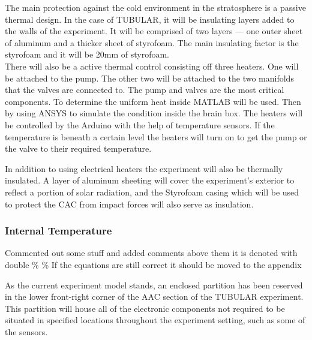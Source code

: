 The main protection against the cold environment in the stratosphere is a passive thermal design. In the case of TUBULAR, it will be insulating layers added to the walls of the experiment. It will be comprised of two layers --- one outer sheet of aluminum and a thicker sheet of styrofoam. The main insulating factor is the styrofoam and it will be 20mm of styrofoam. \\
There will also be a active thermal control consisting off three heaters. One will be attached to the pump. The other two will be attached to the two manifolds that the valves are connected to. The pump and valves are the most critical components. To determine the uniform heat inside MATLAB will be used. Then by using ANSYS to simulate the condition inside the brain box.
The heaters will be controlled by the Arduino with the help of temperature sensors. If the temperature is beneath a certain level the heaters will turn on to get the pump or the valve to their required temperature.
%

\begin{centering}
In addition to using electrical heaters the experiment will also be thermally insulated. A layer of aluminum sheeting will cover the experiment's exterior to reflect a portion of solar radiation, and the Styrofoam casing which will be used to protect the CAC from impact forces will also serve as insulation. %
\end{centering}



\pagebreak


\raggedbottom

\subsubsection{Internal Temperature}
Commented out some stuff and added comments above them it is denoted with double \% \%
If the equations are still correct it should be moved to the appendix 

As the current experiment model stands, an enclosed partition has been reserved in the lower front-right corner of the AAC section of the TUBULAR experiment. This partition will house all of the electronic components not required to be situated in specified locations throughout the experiment setting, such as some of the sensors. 

